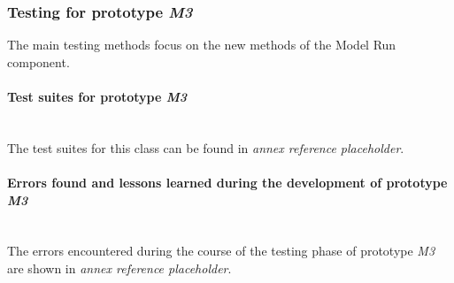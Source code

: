 \subsubsection{Testing for prototype \emph{M3}}

The main testing methods focus on the new methods of the Model Run component.

\paragraph{Test suites for prototype \emph{M3}}\mbox{}\\

The test suites for this class can be found in \emph{annex reference placeholder}.

\paragraph{Errors found and lessons learned during the development of prototype \emph{M3}}\mbox{}\\

The errors encountered during the course of the testing phase of prototype \emph{M3} are shown in \emph{annex reference placeholder}.
